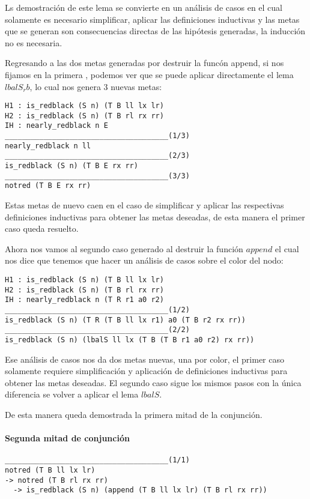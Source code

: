 Ls demostraci\'on de este lema se convierte en un análisis de casos en el cual solamente es
necesario simplificar, aplicar las definiciones inductivas y las metas que se generan son
consecuencias directas de las hipótesis generadas, la inducci\'on no es necesaria.

Regresando a las dos metas generadas por destruir la func\'on append, si nos fijamos en la primera
, podemos ver que se puede aplicar directamente el lema $lbalS_rb$, lo cual nos genera 3 nuevas metas:

\begin{verbatim}
H1 : is_redblack (S n) (T B ll lx lr)
H2 : is_redblack (S n) (T B rl rx rr)
IH : nearly_redblack n E
______________________________________(1/3)
nearly_redblack n ll
______________________________________(2/3)
is_redblack (S n) (T B E rx rr)
______________________________________(3/3)
notred (T B E rx rr)
\end{verbatim}

Estas metas de nuevo caen en el caso de simplificar y aplicar las respectivas definiciones
inductivas para obtener las metas deseadas, de esta manera el primer caso queda resuelto.

Ahora nos vamos al segundo caso generado al destruir la funci\'on $append$ el cual nos dice que
tenemos que hacer un análisis de casos sobre el color del nodo:

\begin{verbatim}
H1 : is_redblack (S n) (T B ll lx lr)
H2 : is_redblack (S n) (T B rl rx rr)
IH : nearly_redblack n (T R r1 a0 r2)
______________________________________(1/2)
is_redblack (S n) (T R (T B ll lx r1) a0 (T B r2 rx rr))
______________________________________(2/2)
is_redblack (S n) (lbalS ll lx (T B (T B r1 a0 r2) rx rr))
\end{verbatim}

Ese análisis de casos nos da dos metas nuevas, una por color, el primer caso solamente requiere
simplificaci\'on y aplicaci\'on de definiciones inductivas para obtener las metas deseadas. El
segundo caso sigue los mismos pasos con la única diferencia se volver a aplicar el lema $lbalS$.

De esta manera queda demostrada la primera mitad de la conjunci\'on.

\paragraph{Segunda mitad de conjunci\'on}

\begin{verbatim}
______________________________________(1/1)
notred (T B ll lx lr)
-> notred (T B rl rx rr)
  -> is_redblack (S n) (append (T B ll lx lr) (T B rl rx rr))
\end{verbatim}

